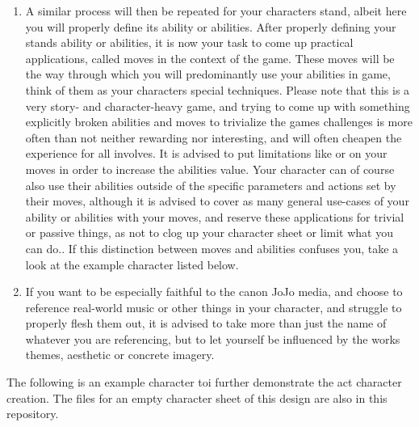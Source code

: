 \documentclass[a4paper,11pt]{article}
\begin{document}
\begin{enumerate}
		\item A similar process will then be repeated for your characters stand, albeit here you will properly define its ability or abilities. After properly defining your stands ability or abilities, it is now your task to come up practical applications, called moves in the context of the game. These moves will be the way through which you will predominantly use your abilities in game, think of them as your characters special techniques. Please note that this is a very story- and character-heavy game, and trying to come up with something explicitly broken abilities and moves to trivialize the games challenges is more often than not neither rewarding nor interesting, and will often cheapen the experience for all involves. It is advised to put limitations like  or  on your moves in order to increase the abilities value. Your character can of course also use their abilities outside of the specific parameters and actions set by their moves, although it is advised to cover as many general use-cases of your ability or abilities with your moves, and reserve these applications for trivial or passive things, as not to clog up your character sheet or limit what you can do.. If this distinction between moves and abilities confuses you, take a look at the example character listed below.
		\item If you want to be especially faithful to the canon JoJo media, and choose to reference real-world music or other things in your character, and struggle to properly flesh them out, it is advised to take more than just the name of whatever you are referencing, but to let yourself be influenced by the works themes, aesthetic or concrete imagery.
		
\end{enumerate}
The following is an example character toi further demonstrate the act character creation. The files for an empty character sheet of this design are also in this repository.

\pagebreak
\end{document}
